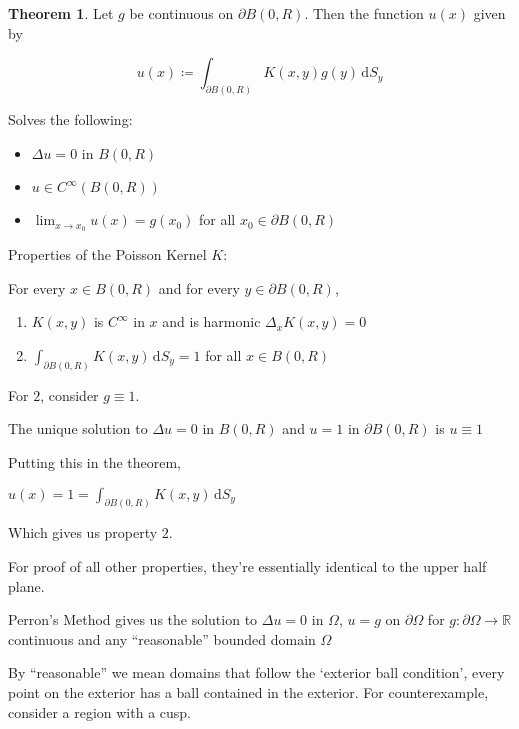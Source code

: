 \documentclass{article}
\theoremstyle{definition}
\newtheorem{theorem}{Theorem}
\begin{document}
\begin{theorem}
    Let \(g\) be continuous on \(\partial B(0,R)\). Then the function \(u(x)\) given by

    \[
        u(x)\coloneqq \int_{\partial B(0,R)}^{} K(x,y)g(y) \,\mathrm{d}S_y 
    \]

    Solves the following:
    
    \begin{itemize}
        \item \(\Delta u=0\) in \(B(0,R)\)
        \item \(u\in C^{\infty} (B(0,R))\)  
        \item \(\lim_{x \to x_0} u(x)=g(x_0)\) for all \(x_0\in \partial B(0,R)\) 
    \end{itemize}

\end{theorem}

Properties of the Poisson Kernel \(K\):

For every \(x\in B(0,R)\) and for every \(y\in \partial B(0,R)\),

\begin{enumerate}
    \item \(K(x,y)\) is \(C^{\infty}\) in \(x\) and is harmonic \(\Delta _x K(x,y)=0\) 
    \item \(\int_{\partial B(0,R)}^{} K(x,y) \,\mathrm{d}S_y= 1 \) for all \(x\in B(0,R)\)  
\end{enumerate}

For \(2\), consider \(g\equiv 1\).

The unique solution to \(\Delta u = 0\) in \(B(0,R)\) and \(u=1\) in \(\partial B(0,R)\) is \(u\equiv 1\) 

Putting this in the theorem,

\(u(x)=1=\int_{\partial B(0,R)}^{} K(x,y) \,\mathrm{d}S_y  \) 

Which gives us property \(2\).

For proof of all other properties, they're essentially identical to the upper half plane.

Perron's Method gives us the solution to \(\Delta u = 0\) in \(\Omega \), \(u=g\) on \(\partial \Omega \) for \(g:\partial \Omega \to \mathbb{R} \) continuous and any ``reasonable'' bounded domain \(\Omega\)

By ``reasonable'' we mean domains that follow the `exterior ball condition', every point on the exterior has a ball contained in the exterior. For counterexample, consider a region with a cusp.
\end{document}
